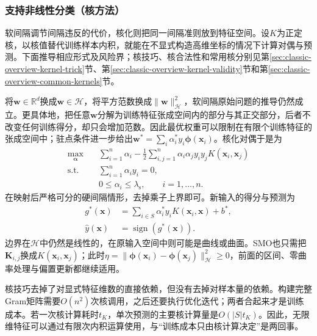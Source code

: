 \subsubsection{支持非线性分类（核方法）}
\label{sec:classification-svm-kernels}

软间隔调节间隔违反的代价，核化则把同一间隔准则放到特征空间。设$K$为正定核，以核值替代训练样本内积，就能在不显式构造高维坐标的情况下计算对偶与预测。下面推导相应形式及风险界；核技巧、核合法性和常用核分别见第\ref{sec:classic-overview-kernel-trick}节、第\ref{sec:classic-overview-kernel-validity}节和第\ref{sec:classic-overview-common-kernels}节。

将$\bm{w}\in\mathbb{R}^d$换成$\bm{w}\in\mathcal{H}$，将平方范数换成$\lVert\bm{w}\rVert_{\mathcal{H}}^2$，软间隔原始问题的推导仍然成立。更具体地，把任意$\bm{w}$分解为训练特征张成空间内的部分与其正交部分，后者不改变任何训练得分，却只会增加范数。因此最优权重可以限制在有限个训练特征的张成空间中；驻点条件进一步给出$\bm{w}^{\ast}=\sum_i\alpha_i^{\ast}y_i\bm{\phi}(\bm{x}_i)$。核化对偶于是为
\begin{equation}
  \begin{aligned}
    \max_{\bm{\alpha}}\quad&
      \sum_{i=1}^n\alpha_i
       -\frac12\sum_{i,j=1}^n
          \alpha_i\alpha_j y_i y_j
          K(\bm{x}_i,\bm{x}_j)\\
    \text{s.t.}\quad&
      \sum_{i=1}^n\alpha_i y_i=0,\\
    &0\le\alpha_i\le\lambda_{\mathrm{s}},
      \qquad i=1,\ldots,n.
  \end{aligned}
  \label{eq:classification-svm-kernel-dual}
\end{equation}
在映射后严格可分的硬间隔情形，去掉乘子上界即可。新输入的得分与预测为
\begin{equation}
  \begin{aligned}
    g^{\ast}(\bm{x})
      &=\sum_{i\in S}\alpha_i^{\ast}y_i
         K(\bm{x}_i,\bm{x})+b^{\ast},\\
    \hat y(\bm{x})&=\operatorname{sign}(g^{\ast}(\bm{x})).
  \end{aligned}
  \label{eq:classification-svm-kernel-prediction}
\end{equation}
边界在$\mathcal{H}$中仍然是线性的，在原输入空间中则可能是曲线或曲面。SMO也只需把$\bm{K}_{i,j}$换成$K(\bm{x}_i,\bm{x}_j)$；此时$\eta=\lVert\bm{\phi}(\bm{x}_i)-\bm{\phi}(\bm{x}_j)\rVert_{\mathcal{H}}^2\ge0$，前面的区间、零曲率处理与偏置更新都继续适用。

核技巧去掉了对显式特征维数的直接依赖，但没有去掉对样本量的依赖。构建完整Gram矩阵需要$O(n^2)$次核调用，之后还要执行优化迭代；两者合起来才是训练成本。若一次核计算耗时$t_K$，单次预测的主要核计算量是$O(|S|t_K)$。因此，无限维特征可以通过有限次内积运算使用，与“训练成本只由核计算决定”是两回事。

